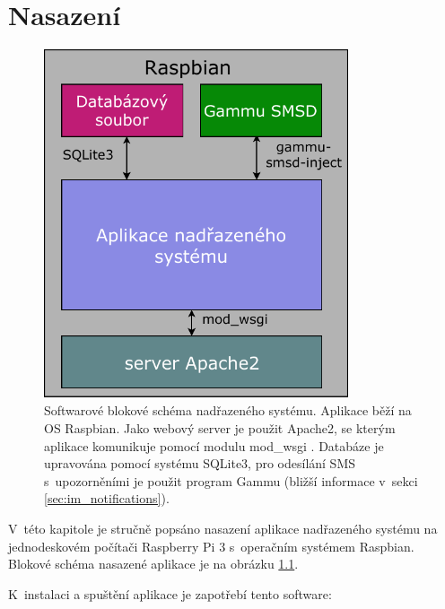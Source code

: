 \chapter{Nasazení}
\label{sec:dp}

\begin{figure}[h!]
    \centering
    \includegraphics[width=0.8\textwidth]{images/sw_block.pdf}
    \caption[Softwarové blokové schéma nadřazeného systému]{Softwarové blokové schéma nadřazeného systému. Aplikace běží na OS Raspbian. Jako webový server je použit Apache2, se kterým aplikace komunikuje pomocí modulu mod\_wsgi \cite{mod_wsgi}. Databáze je upravována pomocí systému SQLite3, pro odesílání SMS s~upozorněními je použit program Gammu (bližší informace v~sekci \ref{sec:im_notifications}).}
    \label{fig:sw_block}
\end{figure}

V~této kapitole je stručně popsáno nasazení aplikace nadřazeného systému na jednodeskovém počítači Raspberry Pi 3 s~operačním systémem Raspbian. Blokové schéma nasazené aplikace je na obrázku \ref{fig:sw_block}. 

K~instalaci a spuštění aplikace je zapotřebí tento software:


